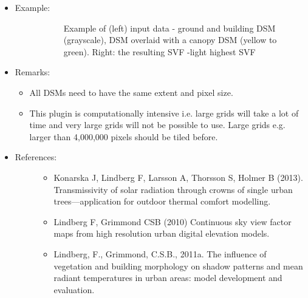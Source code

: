 \documentclass[letterpaper,10pt,english]{sphinxmanual}
\begin{document}
\begin{itemize}
\item {} \begin{description}
\item[{Example:}] \leavevmode
\begin{figure}[htbp]
\centering
\capstart

\noindent{}
\caption{Example of (left) input data - ground and building DSM (grayscale), DSM overlaid with a canopy DSM (yellow to green). Right: the resulting SVF -light highest SVF}\label{\detokenize{pre-processor/Urban Geometry Sky View Factor Calculator:id2}}\end{figure}

\end{description}

\item {} 
Remarks:
\begin{itemize}
\item {} 
All DSMs need to have the same extent and pixel size.

\item {} 
This plugin is computationally intensive i.e. large grids will take a lot of time and very large grids will not be possible to use. Large grids e.g. larger than 4,000,000 pixels should be tiled before.

\end{itemize}

\item {} \begin{description}
\item[{References:}] \leavevmode\begin{itemize}
\item {} 
Konarska J, Lindberg F, Larsson A, Thorsson S, Holmer B (2013). Transmissivity of solar radiation through crowns of single urban trees—application for outdoor thermal comfort modelling. 

\item {} 
Lindberg F, Grimmond CSB (2010) Continuous sky view factor maps from high resolution urban digital elevation models. 

\item {} 
Lindberg, F., Grimmond, C.S.B., 2011a. The influence of vegetation and building morphology on shadow patterns and mean radiant temperatures in urban areas: model development and evaluation. 


\end{itemize}
\end{description}
\end{itemize}
\end{document}
